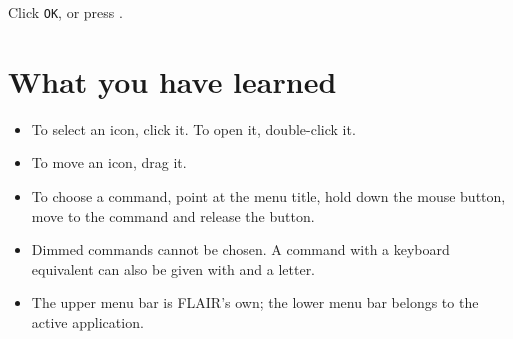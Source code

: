 
\begin{TaskSteps}[resume]
\Step Click \texttt{OK}, or press .
\end{TaskSteps}

\section{What you have learned}
\begin{itemize}
\item To select an icon, click it.  To open it, double-click it.
\item To move an icon, drag it.
\item To choose a command, point at the menu title, hold down the mouse
  button, move to the command and release the button.
\item Dimmed commands cannot be chosen.  A command with a keyboard
  equivalent can also be given with  and a letter.
\item The upper menu bar is FLAIR's own; the lower menu bar belongs to the
  active application.
\end{itemize}
